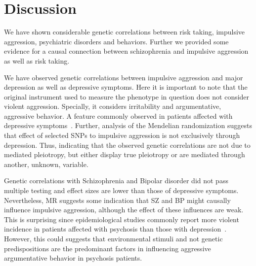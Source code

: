 \section*{Discussion}
\label{sec:discussion}

We have shown considerable genetic correlations between risk taking, impulsive aggression, psychiatric disorders and behaviors.
Further we provided some evidence for a causal connection between schizophrenia and impulsive aggression as well as risk taking.

We have observed genetic correlations between impulsive aggression and major depression as well as depressive symptoms.
Here it is important to note that the original instrument used to measure the phenotype in question does not consider violent aggression.
Specially, it considers irritability and argumentative, aggressive behavior.
A feature commonly observed in patients affected with depressive symptoms~\cite{Dutton2013}.
Further, analysis of the Mendelian randomization suggests that effect of selected SNPs to impulsive aggression is not exclusively through depression.
Thus, indicating that the observed genetic correlations are not due to mediated pleiotropy, but either display true pleiotropy or are mediated through another, unknown, variable.

Genetic correlations with Schizophrenia and Bipolar disorder did not pass multiple testing and effect sizes are lower than those of depressive symptoms.
Nevertheless, MR suggests some indication that SZ and BP might causally influence impulsive aggression, although the effect of these influences are weak.
This is surprising since epidemiological studies commonly report more violent incidence in patients affected with psychosis than those with depression~\cite{Perroud2011}.
However, this could suggests that environmental stimuli and not genetic predispositions are the predominant factors in influencing aggressive argumentative behavior in psychosis patients.


